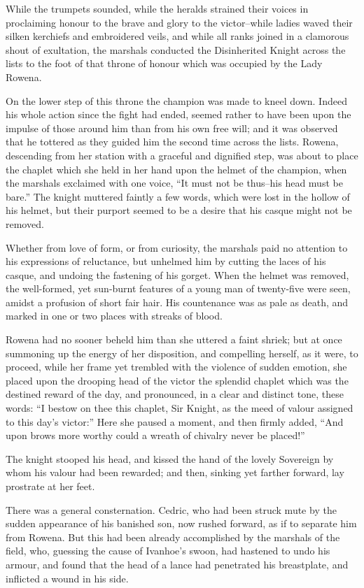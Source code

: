 While the trumpets sounded, while the heralds strained their voices in
proclaiming honour to the brave and glory to the victor--while ladies
waved their silken kerchiefs and embroidered veils, and while all ranks
joined in a clamorous shout of exultation, the marshals conducted the
Disinherited Knight across the lists to the foot of that throne of
honour which was occupied by the Lady Rowena.

On the lower step of this throne the champion was made to kneel down.
Indeed his whole action since the fight had ended, seemed rather to have
been upon the impulse of those around him than from his own free will;
and it was observed that he tottered as they guided him the second time
across the lists. Rowena, descending from her station with a graceful
and dignified step, was about to place the chaplet which she held in her
hand upon the helmet of the champion, when the marshals exclaimed with
one voice, ``It must not be thus--his head must be bare.'' The knight
muttered faintly a few words, which were lost in the hollow of his
helmet, but their purport seemed to be a desire that his casque might
not be removed.

Whether from love of form, or from curiosity, the marshals paid no
attention to his expressions of reluctance, but unhelmed him by cutting
the laces of his casque, and undoing the fastening of his gorget. When
the helmet was removed, the well-formed, yet sun-burnt features of a
young man of twenty-five were seen, amidst a profusion of short fair
hair. His countenance was as pale as death, and marked in one or two
places with streaks of blood.

Rowena had no sooner beheld him than she uttered a faint shriek; but at
once summoning up the energy of her disposition, and compelling herself,
as it were, to proceed, while her frame yet trembled with the violence
of sudden emotion, she placed upon the drooping head of the victor the
splendid chaplet which was the destined reward of the day, and
pronounced, in a clear and distinct tone, these words: ``I bestow on
thee this chaplet, Sir Knight, as the meed of valour assigned to this
day's victor:'' Here she paused a moment, and then firmly added, ``And
upon brows more worthy could a wreath of chivalry never be placed!''

The knight stooped his head, and kissed the hand of the lovely Sovereign
by whom his valour had been rewarded; and then, sinking yet farther
forward, lay prostrate at her feet.

There was a general consternation. Cedric, who had been struck mute by
the sudden appearance of his banished son, now rushed forward, as if to
separate him from Rowena. But this had been already accomplished by the
marshals of the field, who, guessing the cause of Ivanhoe's swoon, had
hastened to undo his armour, and found that the head of a lance had
penetrated his breastplate, and inflicted a wound in his side.
